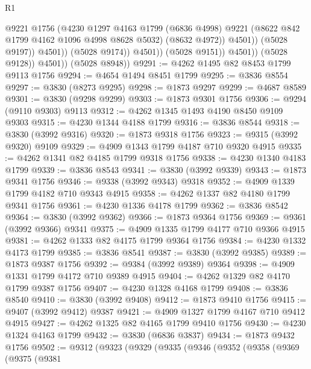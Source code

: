 \begin{lexlean}{R1}
\begin{coremodule}
                                  @9221
                                  @1756
                                  (@4230
                                    @1297
                                    @4163
                                    @1799
                                    (@6836 @4998)
                                    @9221
                                    (@8622 @842 @1799 @4162 @1096 @4998 @8628 @5032)
                                    (@8632 @4972))
                                  @4501))
                              (@5028 @9197))
                            @4501))
                        (@5028 @9174))
                      @4501))
                  (@5028 @9151))
                @4501))
            (@5028 @9128))
          @4501))
      (@5028 @8948))
@9291 := @4262 @1495 @82 @8453 @1799 @9113 @1756
@9294 := @4654 @1494 @8451 @1799
@9295 := @3836 @8554
@9297 := @3830 (@8273 @9295)
@9298 := @1873 @9297
@9299 := @4687 @8589
@9301 := @3830 (@9298 @9299)
@9303 := @1873 @9301 @1756
@9306 := @9294 (@9110 @9303) @9113
@9312 := @4262 @1345 @1493 @4190 @8450 @9109 @9303
@9315 := @4230 @1344 @4188 @1799
@9316 := @3836 @8544
@9318 := @3830 (@3992 @9316)
@9320 := @1873 @9318 @1756
@9323 := @9315 (@3992 @9320) @9109
@9329 := @4909 @1343 @1799 @4187 @710 @9320 @4915
@9335 := @4262 @1341 @82 @4185 @1799 @9318 @1756
@9338 := @4230 @1340 @4183 @1799
@9339 := @3836 @8543
@9341 := @3830 (@3992 @9339)
@9343 := @1873 @9341 @1756
@9346 := @9338 (@3992 @9343) @9318
@9352 := @4909 @1339 @1799 @4182 @710 @9343 @4915
@9358 := @4262 @1337 @82 @4180 @1799 @9341 @1756
@9361 := @4230 @1336 @4178 @1799
@9362 := @3836 @8542
@9364 := @3830 (@3992 @9362)
@9366 := @1873 @9364 @1756
@9369 := @9361 (@3992 @9366) @9341
@9375 := @4909 @1335 @1799 @4177 @710 @9366 @4915
@9381 := @4262 @1333 @82 @4175 @1799 @9364 @1756
@9384 := @4230 @1332 @4173 @1799
@9385 := @3836 @8541
@9387 := @3830 (@3992 @9385)
@9389 := @1873 @9387 @1756
@9392 := @9384 (@3992 @9389) @9364
@9398 := @4909 @1331 @1799 @4172 @710 @9389 @4915
@9404 := @4262 @1329 @82 @4170 @1799 @9387 @1756
@9407 := @4230 @1328 @4168 @1799
@9408 := @3836 @8540
@9410 := @3830 (@3992 @9408)
@9412 := @1873 @9410 @1756
@9415 := @9407 (@3992 @9412) @9387
@9421 := @4909 @1327 @1799 @4167 @710 @9412 @4915
@9427 := @4262 @1325 @82 @4165 @1799 @9410 @1756
@9430 := @4230 @1324 @4163 @1799
@9432 := @3830 (@6836 @3837)
@9434 := @1873 @9432 @1756
@9502 := @9312
    (@9323
      (@9329
        (@9335
          (@9346
            (@9352
              (@9358
                (@9369
                  (@9375
                    (@9381

\end{coremodule}
\end{lexlean}
